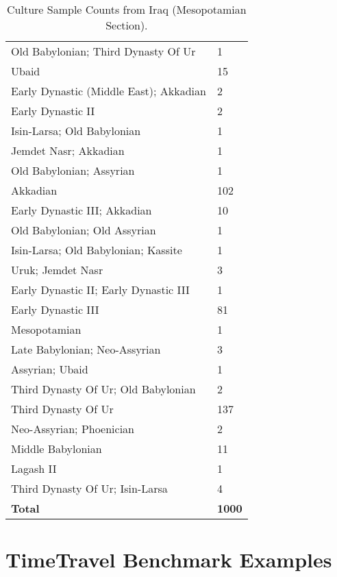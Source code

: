 \documentclass[11pt]{article}
\begin{document}
\begin{table}[ht!]
\begin{tabularx}{\columnwidth}{Xl}
        Old Babylonian; Third Dynasty Of Ur & 1 \\
        Ubaid & 15 \\
        Early Dynastic (Middle East); Akkadian & 2 \\
        Early Dynastic II & 2 \\
        Isin-Larsa; Old Babylonian & 1 \\
        Jemdet Nasr; Akkadian & 1 \\
        Old Babylonian; Assyrian & 1 \\
        Akkadian & 102 \\
        Early Dynastic III; Akkadian & 10 \\
        Old Babylonian; Old Assyrian & 1 \\
        Isin-Larsa; Old Babylonian; Kassite & 1 \\
        Uruk; Jemdet Nasr & 3 \\
        Early Dynastic II; Early Dynastic III & 1 \\
        Early Dynastic III & 81 \\
        Mesopotamian & 1 \\
        Late Babylonian; Neo-Assyrian & 3 \\
        Assyrian; Ubaid & 1 \\
        Third Dynasty Of Ur; Old Babylonian & 2 \\
        Third Dynasty Of Ur & 137 \\
        Neo-Assyrian; Phoenician & 2 \\
        Middle Babylonian & 11 \\
        Lagash II & 1 \\
        Third Dynasty Of Ur; Isin-Larsa & 4 \\
        \hline
        \rowcolor{brown!10}\textbf{Total} & \textbf{1000} \\
        \hline
    \end{tabularx}
    \caption{Culture Sample Counts from Iraq (Mesopotamian Section).}
    \label{tab:culture-sample-iraq}
\end{table}


\section{TimeTravel Benchmark Examples}
\label{appendix:data_stats}
\end{document}
